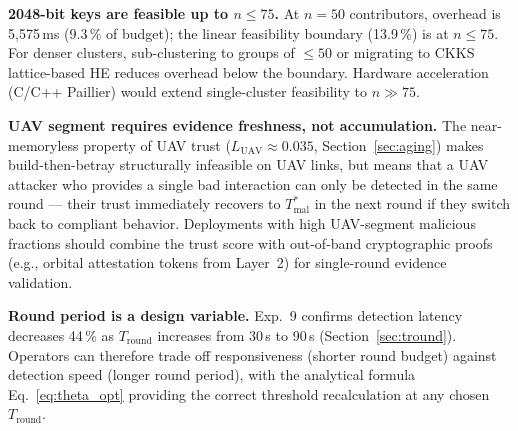 \documentclass[journal,twoside,10pt]{IEEEtran}
\begin{document}
\textbf{2048-bit keys are feasible up to $n\!\leq\!75$.}
At $n\!=\!50$ contributors, overhead is 5{,}575\,ms (9.3\,\% of budget);
the linear feasibility boundary (13.9\,\%) is at $n\!\leq\!75$.
For denser clusters, sub-clustering to groups of $\leq\!50$ or
migrating to CKKS lattice-based HE reduces overhead below the boundary.
Hardware acceleration (C/C++ Paillier) would extend single-cluster
feasibility to $n\!\gg\!75$.

\textbf{UAV segment requires evidence freshness, not accumulation.}
The near-memoryless property of UAV trust ($L_{\mathrm{UAV}}\!\approx\!0.035$,
Section~\ref{sec:aging}) makes build-then-betray structurally infeasible
on UAV links, but means that a UAV attacker who provides a single bad
interaction can only be detected in the same round --- their trust
immediately recovers to $T^*_{\mathrm{mal}}$ in the next round if
they switch back to compliant behavior.
Deployments with high UAV-segment malicious fractions should combine
the trust score with out-of-band cryptographic proofs (e.g., orbital
attestation tokens from Layer~2) for single-round evidence validation.

\textbf{Round period is a design variable.}
Exp.~9 confirms detection latency decreases 44\,\% as $T_{\mathrm{round}}$
increases from 30\,s to 90\,s (Section~\ref{sec:tround}).
Operators can therefore trade off responsiveness (shorter round budget)
against detection speed (longer round period), with the analytical
formula Eq.~\eqref{eq:theta_opt} providing the correct threshold
recalculation at any chosen $T_{\mathrm{round}}$.
\end{document}
